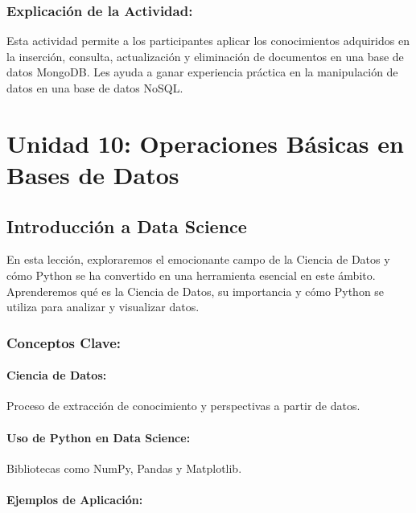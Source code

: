 \documentclass[
  a4paper,
  DIV=11,
  numbers=noendperiod,
  onepage,
  openany]{scrreprt}
\begin{document}
\section{Explicación de la
Actividad:}\label{explicaciuxf3n-de-la-actividad-8}

Esta actividad permite a los participantes aplicar los conocimientos
adquiridos en la inserción, consulta, actualización y eliminación de
documentos en una base de datos MongoDB. Les ayuda a ganar experiencia
práctica en la manipulación de datos en una base de datos NoSQL.

\part{Unidad 10: Operaciones Básicas en Bases de Datos}

\chapter{Introducción a Data
Science}\label{introducciuxf3n-a-data-science}

En esta lección, exploraremos el emocionante campo de la Ciencia de
Datos y cómo Python se ha convertido en una herramienta esencial en este
ámbito. Aprenderemos qué es la Ciencia de Datos, su importancia y cómo
Python se utiliza para analizar y visualizar datos.

\section{Conceptos Clave:}\label{conceptos-clave-31}

\subsection{Ciencia de Datos:}\label{ciencia-de-datos}

Proceso de extracción de conocimiento y perspectivas a partir de datos.

\subsection{Uso de Python en Data
Science:}\label{uso-de-python-en-data-science}

Bibliotecas como NumPy, Pandas y Matplotlib.

\subsection{Ejemplos de Aplicación:}\label{ejemplos-de-aplicaciuxf3n}
\end{document}
